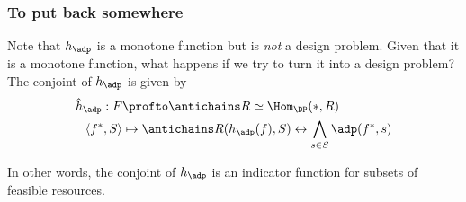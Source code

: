  


\subsubsection{To put back somewhere}
Note that $h_\adp$ is a monotone function but is \emph{not} a design problem. Given that it is a monotone function, what happens if we try to turn it into a design problem? The conjoint of $h_\adp$ is given by
\begin{equation}
\begin{aligned}
\hat h_\adp : F &\profto \antichains R \simeq \Hom_\DP(\ast, R) \\
\langle f^*, S \rangle &\mapsto \antichains R(h_\adp(f), S) \leftrightarrow \bigwedge_{s\in S} \adp(f^*, s)
\end{aligned}
\end{equation}

In other words, the conjoint of $h_\adp$ is an indicator function for subsets of feasible resources.
